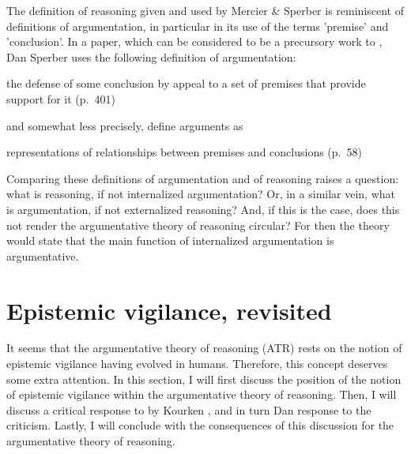 The definition of reasoning given and used by Mercier \& Sperber is reminiscent of definitions of argumentation, in particular in its use of the terms 'premise' and 'conclusion'. In a \citeyear{Sperber01} paper, which can be considered to be a precursory work to \citet{MS11}, Dan Sperber uses the following definition of argumentation:
\begin{quoting}
    the defense of some conclusion by appeal to a set of premises that provide support for it
    \hfill (p.~401)
\end{quoting}
and somewhat less precisely, \citet{MS11} define arguments as
\begin{quoting}
    representations of relationships between premises and conclusions
    \hfill (p.~58)
\end{quoting}

Comparing these definitions of argumentation and of reasoning raises a question: what is reasoning, if not internalized argumentation? Or, in a similar vein, what is argumentation, if not externalized reasoning? And, if this is the case, does this not render the argumentative theory of reasoning circular? For then the theory would state that the main function of internalized argumentation is argumentative.

\section{Epistemic vigilance, revisited}
\label{sec:EV-scrutiny}

It seems that the argumentative theory of reasoning (ATR) rests on the notion of epistemic vigilance having evolved in humans. Therefore, this concept deserves some extra attention.
In this section, I will first discuss the position of the notion of epistemic vigilance within the argumentative theory of reasoning. Then, I will discuss a critical response to \citet{Sperber10} by Kourken \citet{Michaelian13}, and in turn Dan  response to the criticism. Lastly, I will conclude with the consequences of this discussion for the argumentative theory of reasoning.

